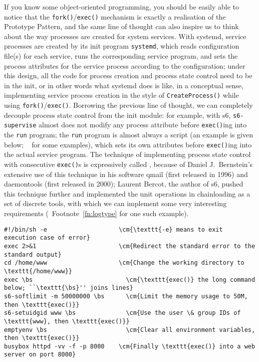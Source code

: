 If you know some object-oriented programming, you should be easily able to
notice that the \verb|fork()|/\verb|exec()| mechanism is exactly a realisation
of the Prototype Pattern, and the same line of thought can also inspire us
to think about the way processes are created for system services.  With systemd,
service processes are created by its init program \verb|systemd|, which reads
configuration file(s) for each service, runs the corresponding service program,
and sets the process attributes for the service process according to the
configuration; under this design, all the code for process creation and process
state control need to be in the init, or in other words what systemd does is
like, in a conceptual sense, implementing service process creation in the style
of \verb|CreateProcess()| while using \verb|fork()|/\verb|exec()|.  Borrowing
the previous line of thought, we can completely decouple process state control
from the init module: for example, with s6, \verb|s6-supervise| almost does
not modify any process attribute before \verb|exec()|ing into the \verb|run|
program; the \verb|run| program is almost always a script (an example is given
below; \cf~\parencite{pollard2014} for some examples), which sets its own
attributes before \verb|exec()|ing into the actual service program.  The
technique of implementing process state control with consecutive \verb|exec()|s
is expressively called , because of Daniel
J.\ Bernstein's extensive use of this technique in his software qmail (first
released in 1996) and daemontools (first released in 2000); Laurent Bercot,
the author of s6, pushed this technique further and implemented the unit
operations in chainloading as a set of discrete tools,
with which we can implement some very interesting requirements
(\cf~Footnote~\ref{fn:logtype} for one such example).
\begin{wquoting}
\begin{Verbatim}[commandchars = {\\\{\}}]
#!/bin/sh -e                    \cm{\texttt{-e} means to exit execution case of error}
exec 2>&1                       \cm{Redirect the standard error to the standard output}
cd /home/www                    \cm{Change the working directory to \texttt{/home/www}}
exec \bs                          \cm{\texttt{exec()} the long command below; ``\texttt{\bs}'' joins lines}
s6-softlimit -m 50000000 \bs      \cm{Limit the memory usage to 50M, then \texttt{exec()}}
s6-setuidgid www \bs              \cm{Use the user \& group IDs of \texttt{www}, then \texttt{exec()}}
emptyenv \bs                      \cm{Clear all environment variables, then \texttt{exec()}}
busybox httpd -vv -f -p 8000    \cm{Finally \texttt{exec()} into a web server on port 8000}
\end{Verbatim}
\end{wquoting}

